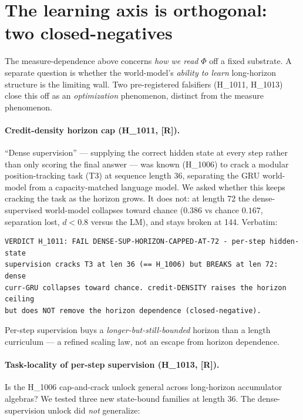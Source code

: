\documentclass[11pt,a4paper]{article}
\providecommand{\tierRed}{\textcolor{red!70!black}{\textbf{[R]}}}
\begin{document}
\section{The learning axis is orthogonal: two closed-negatives}
\label{sec:learning}

The measure-dependence above concerns \emph{how we read} $\Phi$ off a fixed
substrate. A separate question is whether the world-model's \emph{ability to
learn} long-horizon structure is the limiting wall. Two pre-registered
falsifiers (H\_1011, H\_1013) close this off as an \emph{optimization}
phenomenon, distinct from the measure phenomenon.

\paragraph{Credit-density horizon cap (H\_1011, \tierRed).} ``Dense
supervision'' --- supplying the correct hidden state at every step rather than
only scoring the final answer --- was known (H\_1006) to crack a modular
position-tracking task (T3) at sequence length 36, separating the GRU
world-model from a capacity-matched language model. We asked whether this
keeps cracking the task as the horizon grows. It does not: at length 72 the
dense-supervised world-model collapses toward chance ($0.386$ vs chance
$0.167$, separation lost, $d<0.8$ versus the LM), and stays broken at 144.
Verbatim:

\begin{lstlisting}[basicstyle=\ttfamily\footnotesize,frame=single,xleftmargin=0pt,breaklines=true]
VERDICT H_1011: FAIL DENSE-SUP-HORIZON-CAPPED-AT-72 - per-step hidden-state
supervision cracks T3 at len 36 (== H_1006) but BREAKS at len 72: dense
curr-GRU collapses toward chance. credit-DENSITY raises the horizon ceiling
but does NOT remove the horizon dependence (closed-negative).
\end{lstlisting}

\noindent Per-step supervision buys a \emph{longer-but-still-bounded} horizon
than a length curriculum --- a refined scaling law, not an escape from horizon
dependence.

\paragraph{Task-locality of per-step supervision (H\_1013, \tierRed).} Is the
H\_1006 cap-and-crack unlock general across long-horizon accumulator algebras?
We tested three new state-bound families at length 36. The dense-supervision
unlock did \emph{not} generalize:
\end{document}
